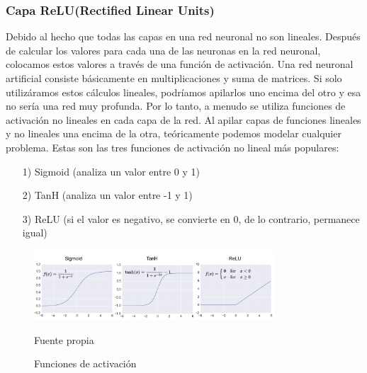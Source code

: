 	\subsubsection  {Capa ReLU(Rectified Linear Units)}
		\vskip 0.4cm 
		Debido al hecho que todas las capas en una red neuronal no son lineales. Después de calcular los valores para cada una de las neuronas en la red neuronal, colocamos estos valores a través de una función de activación. Una red neuronal artificial consiste básicamente en multiplicaciones y suma de matrices. Si solo utilizáramos estos cálculos lineales, podríamos apilarlos uno encima del otro y esa no sería una red muy profunda. Por lo tanto, a menudo se utiliza funciones de activación no lineales en cada capa de la red. Al apilar capas de funciones lineales y no lineales una encima de la otra, teóricamente podemos modelar cualquier problema.
		\vskip 0.4cm 
		Estas son las tres funciones de activación no lineal más populares:
		\begin{enumerate}
		\item[1)] Sigmoid (analiza un valor entre 0 y 1)  \vspace{-0.5em}
		\item[2)] TanH (analiza un valor entre -1 y 1) \vspace{-0.5em}
		\item[3)] ReLU (si el valor es negativo, se convierte en 0, de lo contrario, permanece igual) \vspace{-0.5em}
		\end{enumerate}

		\begin{figure}[H]
		\begin{center}
		\includegraphics[width=0.8\textwidth]{images/marcoteorico/activfunct}
		\end{center}
		\begin{center}
		\caption{\small{Funciones de activación}}
		\vskip -0.2cm  
		{\small{Fuente propia}}
		\end{center}
		\vspace{-1.5em}
		\end{figure}


